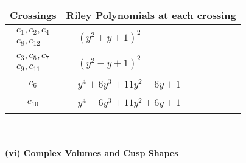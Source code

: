 \documentclass[1p]{elsarticle_modified}
\theoremstyle{definition}
\begin{document}
\begin{tabular}{m{50pt}|m{274pt}}
Crossings & \hspace{64pt}Riley Polynomials at each crossing \\
\hline $$\begin{aligned}c_{1},c_{2},c_{4}\\c_{8},c_{12}\end{aligned}$$&$\begin{aligned}
&(y^2+y+1)^2
\end{aligned}$\\
\hline $$\begin{aligned}c_{3},c_{5},c_{7}\\c_{9},c_{11}\end{aligned}$$&$\begin{aligned}
&(y^2- y+1)^2
\end{aligned}$\\
\hline $$\begin{aligned}c_{6}\end{aligned}$$&$\begin{aligned}
&y^4+6 y^3+11 y^2-6 y+1
\end{aligned}$\\
\hline $$\begin{aligned}c_{10}\end{aligned}$$&$\begin{aligned}
&y^4-6 y^3+11 y^2+6 y+1
\end{aligned}$\\
\hline
\end{tabular}\\~\\
\newpage\flushleft \textbf{(vi) Complex Volumes and Cusp Shapes}
\end{document}
